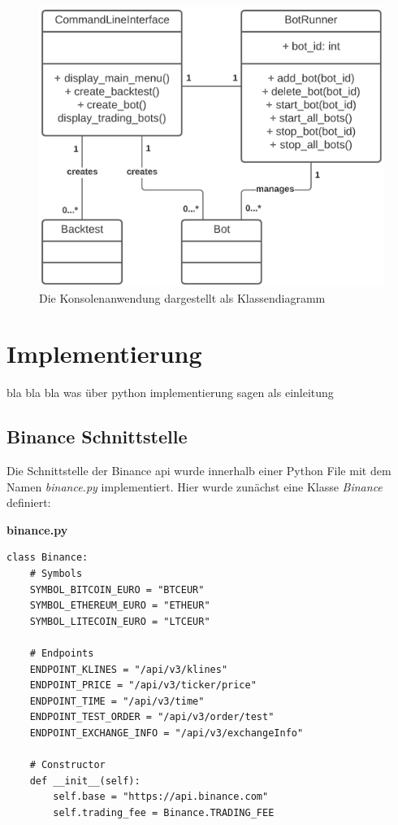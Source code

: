 \documentclass[oneside]{ausarbeitung}
\begin{document}
\begin{figure}[H]
  \centering
  \includegraphics[height=0.42\textheight]{uml/cli_uml.png}
  \caption{Die Konsolenanwendung dargestellt als Klassendiagramm}
  \label{fig:15}
\end{figure}

\chapter{Implementierung}
\label{cha:implementierung}

bla bla bla was über python implementierung sagen als einleitung


\section{Binance Schnittstelle}
\label{sec:binance_schnittstelle}

Die Schnittstelle der Binance \ac{api} wurde innerhalb einer Python File mit dem Namen \textit{binance.py} implementiert. Hier wurde zunächst eine Klasse \textit{Binance} definiert:

\lstset{language=Python}
\lstset{frame=lines}
\lstset{basicstyle=\footnotesize}
\textbf{binance.py}
\begin{lstlisting}
class Binance:
	# Symbols
    SYMBOL_BITCOIN_EURO = "BTCEUR"
    SYMBOL_ETHEREUM_EURO = "ETHEUR"
    SYMBOL_LITECOIN_EURO = "LTCEUR"

	# Endpoints
    ENDPOINT_KLINES = "/api/v3/klines"
    ENDPOINT_PRICE = "/api/v3/ticker/price"
    ENDPOINT_TIME = "/api/v3/time"
    ENDPOINT_TEST_ORDER = "/api/v3/order/test"
    ENDPOINT_EXCHANGE_INFO = "/api/v3/exchangeInfo"
	
	# Constructor
	def __init__(self):
		self.base = "https://api.binance.com"
		self.trading_fee = Binance.TRADING_FEE
\end{lstlisting}
\end{document}
